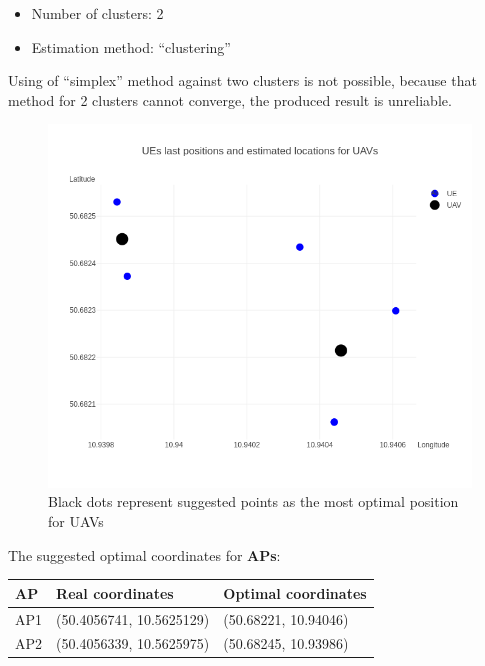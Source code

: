 \begin{itemize}
\tightlist
\item
  Number of clusters: 2
\item
  Estimation method: ``clustering''
\end{itemize}

Using of ``simplex'' method against two clusters is not possible,
because that method for 2 clusters cannot converge, the produced result
is unreliable.

\begin{figure}[H]
	\centering
	\includegraphics[width=\linewidth,keepaspectratio]{images/Expt4_Estimated UAVs_locations.png}
\caption{Black dots represent suggested points as the most optimal
position for UAVs}
\end{figure}

The suggested optimal coordinates for \textbf{APs}:

\begin{longtable}[]{@{}lll@{}}
\toprule
AP & Real coordinates & Optimal coordinates\tabularnewline
\midrule
\endhead
AP1 & (50.4056741, 10.5625129) & (50.68221, 10.94046)\tabularnewline
AP2 & (50.4056339, 10.5625975) & (50.68245, 10.93986)\tabularnewline
\bottomrule
\end{longtable}

